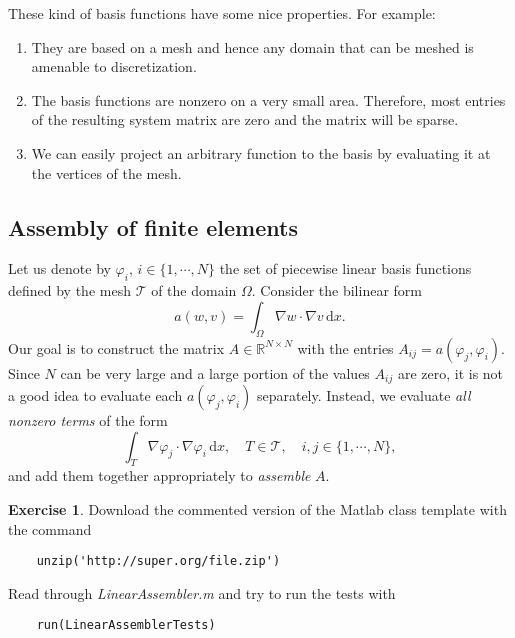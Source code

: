 \documentclass{amsart}
\theoremstyle{definition}
\newtheorem{exercise}{\color{red}Exercise}
\begin{document}
These kind of basis functions have some nice properties.
For example:
\begin{enumerate}
\item They are based on a mesh and hence any domain
  that can be meshed is amenable to discretization.
\item The basis functions are nonzero on a very small area.
  Therefore, most entries of the resulting system matrix are zero
  and the matrix will be sparse.
\item We can easily project an arbitrary function to the
  basis by evaluating it at the vertices of the mesh.
\end{enumerate}

\subsection{Assembly of finite elements}

Let us denote by $\varphi_i$, $i \in \{1, \cdots, N\}$ the set of
piecewise linear basis functions defined by the mesh $\mathcal{T}$
of the domain $\Omega$.
Consider the bilinear form
\begin{equation}
  a(w,v) = \int_\Omega \nabla w \cdot \nabla v\,\mathrm{d}x.
\end{equation}
Our goal is to construct the matrix $A \in \mathbb{R}^{N \times N}$
with the entries $A_{ij} = a(\varphi_j, \varphi_i)$.  Since $N$ can be
very large and a large portion of the values $A_{ij}$ are zero, it is
not a good idea to evaluate each $a(\varphi_j, \varphi_i)$
separately. Instead, we evaluate \emph{all nonzero terms} of the form
\begin{equation}
  \label{eq:integral}
    \int_T \nabla \varphi_j \cdot \nabla \varphi_i\,\mathrm{d}x, \quad T \in \mathcal{T}, \quad i,j \in \{1,\cdots,N\},
\end{equation}
and add them together appropriately to \emph{assemble} $A$.

\begin{exercise}
  Download the commented version of the Matlab class template with the command
  \begin{lstlisting}
    unzip('http://super.org/file.zip')
  \end{lstlisting}
  Read through \emph{LinearAssembler.m} and try to run the tests with
  \begin{lstlisting}
    run(LinearAssemblerTests)
  \end{lstlisting}
\end{exercise}
\end{document}
